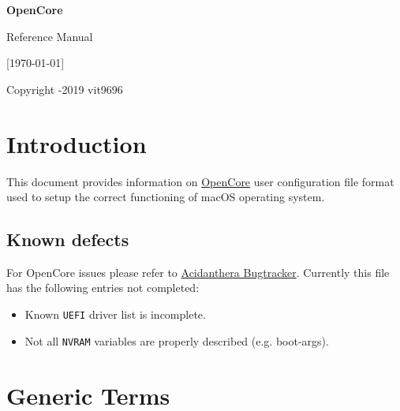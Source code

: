 \documentclass[]{article}
\begin{document}
\begin{titlepage}
   \begin{center}
       \vspace*{3.5in}

       \Huge

       \textbf{OpenCore}

       \vspace{0.2in}

       Reference Manual

       \vspace{0.2in}

        {[}\today{]}

       \normalsize

       \vfill

       Copyright -2019 vit9696

   \end{center}
\end{titlepage}

\tableofcontents

\section{Introduction}\label{introduction}

This document provides information on
\href{https://github.com/acidanthera/OpenCorePkg}{OpenCore} user
configuration file format used to setup the correct functioning of macOS
operating system.

\subsection{Known defects}\label{reported-defects}

For OpenCore issues please refer to
\href{https://github.com/acidanthera/bugtracker}{Acidanthera Bugtracker}.
Currently this file has the following entries not completed:

\begin{itemize}
\item Known \texttt{UEFI} driver list is incomplete.
\item Not all \texttt{NVRAM} variables are properly described (e.g. boot-args).
\end{itemize}

\section{Generic Terms}\label{generic-terms}
\end{document}
